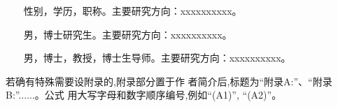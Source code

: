 \documentclass[10.5pt,twocolumn]{jbuaa}
\begin{document}
{
\renewcommand{\baselinestretch}{0.9}
\liuhao


}



{
\xiaowuhao
{}

~~~ 性别，学历，职称。主要研究方向：xxxxxxxxxx。
\vskip 16pt

~~~ 男，博士研究生。主要研究方向：xxxxxxxxxx。
\vskip 16pt

~~~ 男，博士，教授，博士生导师。主要研究方向：xxxxxxxxxx。
}


\vskip 20pt
 
 
若确有特殊需要设附录的,附录部分置于作
者简介后,标题为“附录A:”、“附录B:”......。公式
用大写字母和数字顺序编号,例如“(A1)”, “(A2)”。




\clearpage
\newpage
\pagestyle{fancy}
\fancyhf{}
\lhead{}
\rhead{}
\lfoot{}
\cfoot{}
\rfoot{}
\renewcommand{\headrule}{%
\hrule height0.4pt width \headwidth \vskip1.0pt%
\hrule height0.4pt width \headwidth \vskip-2pt}
\end{document}
